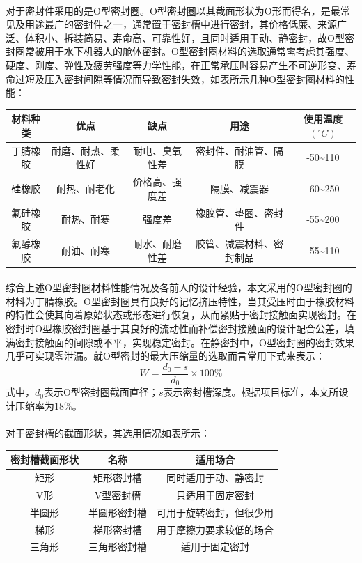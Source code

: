 \documentclass{ctexart}
\begin{document}
\paragraph{}对于密封件采用的是O型密封圈。O型密封圈以其截面形状为O形而得名，是最常见及用途最广的密封件之一，通常置于密封槽中进行密封，其价格低廉、来源广泛、体积小、拆装简易、寿命高、可靠性好，且同时适用于动、静密封，故O型密封圈常被用于水下机器人的舱体密封。O型密封圈材料的选取通常需考虑其强度、硬度、刚度、弹性及疲劳强度等力学性能，在正常承压时容易产生不可逆形变、寿命过短及压入密封间隙等情况而导致密封失效，如表所示几种O型密封圈材料的性能： 
\begin{tabular}{|c|c|c|c|c|}
    \hline
    材料种类&优点&缺点&用途 & 使用温度$(^\circ C)$ \\
    \hline
    丁腈橡胶&耐磨、耐热、柔性好&耐电、臭氧性差&密封件、耐油管、隔膜&-50\~{}110 \\
    \hline
    硅橡胶&耐热、耐老化&价格高、强度差&隔膜、减震器&-60\~{}250 \\
    \hline
    氟硅橡胶&耐热、耐寒&强度差&橡胶管、垫圈、密封件&-55\~{}200 \\
    \hline
    氟醇橡胶&耐油、耐寒&耐水、耐磨性差&胶管、减震材料、密封制品&-55\~{}110 \\
    \hline
\end{tabular}
\paragraph{}综合上述O型密封圈材料性能情况及各前人的设计经验，本文采用的O型密封圈的材料为丁腈橡胶。O型密封圈具有良好的记忆挤压特性，当其受压时由于橡胶材料的特性会使其向着原始状态或形态进行恢复，从而紧贴于密封接触面实现密封。在密封时O型橡胶密封圈基于其良好的流动性而补偿密封接触面的设计配合公差，填满密封接触面的间隙或不平，实现稳定密封。在静密封中，O型密封圈的密封效果几乎可实现零泄漏。就O型密封的最大压缩量的选取而言常用下式来表示：
\[W=\frac{d_0-s}{d_0}\times 100\%     \]
式中，$d_0$表示O型密封圈截面直径；$s$表示密封槽深度。根据项目标准，本文所设计压缩率为$18\%$。
\paragraph{}对于密封槽的截面形状，其选用情况如表所示：\\ 
\begin{tabular}{|c|c|c|}
    \hline
    密封槽截面形状&名称&适用场合 \\
    \hline
    矩形&矩形密封槽&同时适用于动、静密封 \\
    \hline
    V形&V型密封槽&只适用于固定密封 \\
    \hline
    半圆形&半圆形密封槽&可用于旋转密封，但很少用 \\
    \hline
    梯形&梯形密封槽&用于摩擦力要求较低的场合 \\
    \hline
    三角形&三角形密封槽&适用于固定密封 \\
    \hline
\end{tabular}
\end{document}
